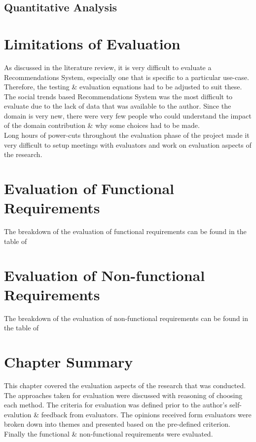 \subsection{Quantitative Analysis}

\section{Limitations of Evaluation}
As discussed in the literature review, it is very difficult to evaluate a Recommendations System, especially one that is specific to a particular use-case. Therefore, the testing \& evaluation equations had to be adjusted to suit these.
The social trends based Recommendations System was the most difficult to evaluate due to the lack of data that was available to the author.
Since the domain is very new, there were very few people who could understand the impact of the domain contribution \& why some choices had to be made.\\
Long hours of power-cuts throughout the evaluation phase of the project made it very difficult to setup meetings with evaluators and work on evaluation aspects of the research.

\section{Evaluation of Functional Requirements}
The breakdown of the evaluation of functional requirements can be found in the table  of \textbf{}

\section{Evaluation of Non-functional Requirements}
The breakdown of the evaluation of non-functional requirements can be found in the table  of \textbf{}

\section{Chapter Summary}
This chapter covered the evaluation aspects of the research that was conducted. The approaches taken for evaluation were discussed with reasoning of choosing each method. The criteria for evaluation was defined prior to the author's self-evalution \& feedback from evaluators. The opinions received form evaluators were broken down into themes and presented based on the pre-defined criterion. Finally the functional \& non-functional requirements were evaluated.